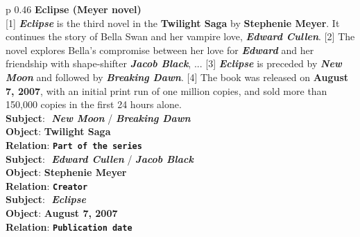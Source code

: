 \documentclass[11pt,a4paper]{article}
\newcommand\BASESIZE{$_{\small \textsc{base}}$\xspace}
\begin{document}
\begin{table}[!t]
\begin{center}

\begin{tabular}{p {0.46\textwidth}}
\toprule
\textbf{Eclipse (Meyer novel)} \\
{\color{olive} [1]} {\color{blue}\bf \textit{Eclipse}} is the third novel in the {\color{red} \bf Twilight Saga} by {\color{red} \bf Stephenie Meyer}. It continues the story of Bella Swan and her vampire love, {\color{blue}\bf \textit{Edward Cullen}}. 
{\color{olive} [2]}  The novel explores Bella's compromise between her love for {\color{blue}\bf \textit{Edward}} and her friendship with shape-shifter {\color{blue}\bf \textit{Jacob Black}},   ... 
{\color{olive} [3]} {\color{blue}\bf \textit{Eclipse}} is preceded by {\color{blue}\bf \textit{New Moon}} and followed by {\color{blue}\bf \textit{Breaking Dawn}}. 
{\color{olive} [4]} The book was released on {\color{red} \bf August 7, 2007}, with an initial print run of one million copies,  and sold more than 150,000 copies in the first 24 hours alone. \\
\midrule
\textbf{Subject}:\,\, {\color{blue}\bf \textit{New Moon}} / {\color{blue}\bf \textit{Breaking Dawn}}   \\
\textbf{Object}: \;  {\color{red} \bf Twilight Saga}  \\
\textbf{Relation}:  {\color{rel} \bf \texttt{Part of the series}}  \\
\midrule
\textbf{Subject}: \,\,{\color{blue}\bf \textit{Edward Cullen}} / {\color{blue}\bf \textit{Jacob Black}}  \\
\textbf{Object}: \;  {\color{red} \bf Stephenie Meyer} \\
\textbf{Relation}:   {\color{rel} \bf \texttt{Creator}} \\
\midrule
\textbf{Subject}:\,\, {\color{blue}\bf \textit{Eclipse}} \\
\textbf{Object}: \; {\color{red} \bf August 7, 2007} \\
\textbf{Relation}: {\color{rel} \bf \texttt{Publication date}} \\
\bottomrule
\end{tabular}
\end{center}
\caption{An example from DocRED~\citep{DocRED}. We show some relational facts detected by CorefBERT\BASESIZE but missed by BERT\BASESIZE.}

\label{tab:docred_case_study}

\end{table}
\end{document}
